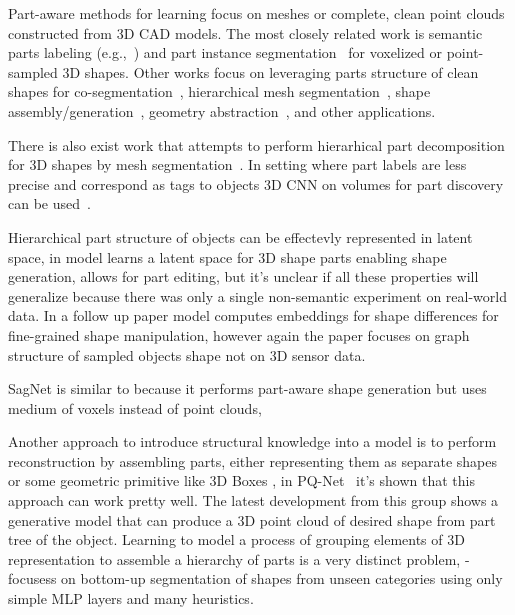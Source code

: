 
Part-aware methods for learning  focus on meshes or complete, clean point clouds constructed from 3D CAD models. The most closely related work  is semantic parts labeling (e.g.,~\cite{yi2016scalable,wang2017cnn,qi2017pointnet,mo2019partnet,yi2019gspn,zhang2019point}) and part instance segmentation~\cite{zhang2019point} for voxelized or point-sampled 3D shapes. Other works focus on leveraging parts structure of clean shapes for co-segmentation~\cite{chen2019bae,zhu2019cosegnet}, hierarchical mesh segmentation~\cite{yi2017learning}, shape assembly/generation~\cite{mo2019structurenet,wu2019sagnet,wu2020pq,mo2020pt2pc}, geometry abstraction~\cite{russell2009associative,li2017grass,sun2019learning}, and other applications.

There is also exist work that attempts to perform hierarhical part decomposition for 3D shapes by mesh segmentation~\cite{yi2017learning}. In setting where part labels are less precise and correspond as tags to objects 3D CNN on volumes for part discovery can be used~\cite{muralikrishnan2018tags2parts}.

Hierarchical part structure of objects can be effectevly represented in latent space, in \cite{mo2019structurenet} model learns a latent space for 3D shape parts enabling shape generation, allows for part editing, but it's unclear if all these properties will generalize because there was only a single non-semantic experiment on real-world data. In a follow up paper \cite{mo2020structedit} model computes embeddings for shape differences for fine-grained shape manipulation, however again the paper focuses on graph structure of sampled objects shape not on 3D sensor data.

SagNet \cite{wu2019sagnet} is similar to \cite{mo2019structurenet} because it performs part-aware shape generation but uses medium of voxels instead of point clouds,

Another approach to introduce structural knowledge into a model is to perform reconstruction by assembling parts, either representing them as separate shapes or some geometric primitive like 3D Boxes \cite{sun2019learning}, in PQ-Net~\cite{wu2020pq} it's shown that this approach can work pretty well. The latest development from this group \cite{mo2020pt2pc} shows a generative model that can produce a 3D point cloud of desired shape from part tree of the object.
Learning to model a process of grouping elements of 3D representation to assemble a hierarchy of parts is a very distinct problem, \cite{luo2020learning} - focusess on bottom-up segmentation of shapes from unseen categories using only simple MLP layers and many heuristics. 

